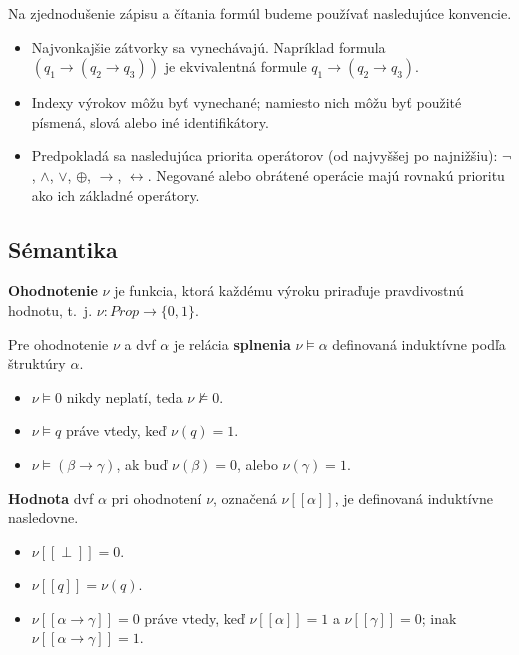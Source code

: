 Na zjednodušenie zápisu a čítania formúl budeme používať nasledujúce konvencie.

\begin{itemize}
    \item Najvonkajšie zátvorky sa vynechávajú. Napríklad formula $(q_1 \xrightarrow{} (q_2 \xrightarrow{} q_3))$ je ekvivalentná formule $q_1 \xrightarrow{} (q_2 \xrightarrow{} q_3)$.
    \item Indexy výrokov môžu byť vynechané; namiesto nich môžu byť použité písmená, slová alebo iné identifikátory.
    \item Predpokladá sa nasledujúca priorita operátorov (od najvyššej po najnižšiu): $\lnot$, $\land$, $\lor$, $\oplus$, $\xrightarrow{}$, $\leftrightarrow$. Negované alebo obrátené operácie majú rovnakú prioritu ako ich základné operátory.
\end{itemize}

\subsection{Sémantika}\label{sec:propositional_logic:semantics}

\begin{definition}
    \textbf{Ohodnotenie} $\nu$ je funkcia, ktorá každému výroku priraďuje pravdivostnú hodnotu, t.~j. $\nu : Prop \xrightarrow{} \{0,1\}$.
\end{definition}

\begin{definition}
    Pre ohodnotenie $\nu$ a \acrshort{dvf} $\alpha$ je relácia \textbf{splnenia} $\nu \models \alpha$ definovaná induktívne podľa štruktúry $\alpha$.
    \begin{itemize}
        \item $\nu \models 0$ nikdy neplatí, teda $\nu \not\models 0$.
        \item $\nu \models q$ práve vtedy, keď $\nu(q) = 1$.
        \item $\nu \models (\beta \xrightarrow{} \gamma)$, ak buď $\nu(\beta) = 0$, alebo $\nu(\gamma) = 1$.
    \end{itemize}
\end{definition}

\begin{definition}
    \textbf{Hodnota} \acrshort{dvf} $\alpha$ pri ohodnotení $\nu$, označená $\nu[[\alpha]]$, je definovaná induktívne nasledovne.
    \begin{itemize}
        \item $\nu[[\perp]] = 0$.
        \item $\nu[[q]] = \nu(q)$.
        \item $\nu[[\alpha \xrightarrow{} \gamma]] = 0$ práve vtedy, keď $\nu[[\alpha]] = 1$ a $\nu[[\gamma]] = 0$; inak $\nu[[\alpha \xrightarrow{} \gamma]] = 1$.
    \end{itemize}
\end{definition}


